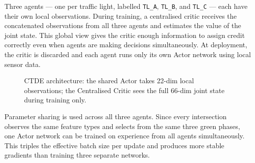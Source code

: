 \documentclass[11pt, a4paper]{report}
\begin{document}
Three agents --- one per traffic light, labelled \texttt{TL\_A}, \texttt{TL\_B}, and \texttt{TL\_C} --- each have their own local observations. During training, a centralised critic receives the concatenated observations from all three agents and estimates the value of the joint state. This global view gives the critic enough information to assign credit correctly even when agents are making decisions simultaneously. At deployment, the critic is discarded and each agent runs only its own Actor network using local sensor data.

\begin{figure}[H]
\centering
{}
\caption{CTDE architecture: the shared Actor takes 22-dim local observations; the Centralised Critic sees the full 66-dim joint state during training only.}
\label{fig:ctde_arch}
\end{figure}

Parameter sharing is used across all three agents. Since every intersection observes the same feature types and selects from the same three green phases, one Actor network can be trained on experience from all agents simultaneously. This triples the effective batch size per update and produces more stable gradients than training three separate networks.
\end{document}
